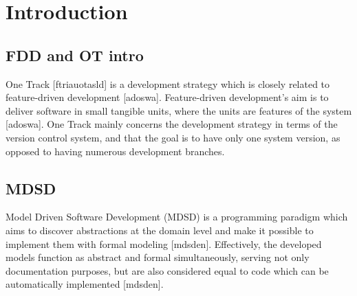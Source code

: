 \documentclass[fina_report_innit.tex]{subfiles}
\begin{document}
\section{Introduction}

\subsection{FDD and OT intro}
One Track [ftriauotasld] is a development strategy which is closely related to feature-driven development [adoswa]. Feature-driven development's aim is to deliver software in small tangible units, where the units are features of the system [adoswa]. One Track mainly concerns the development strategy in terms of the version control system, and that the goal is to have only one system version, as opposed to having numerous development branches. 

\subsection{MDSD}
Model Driven Software Development (MDSD) is a programming paradigm which aims to discover abstractions at the domain level and make it possible to implement them with formal modeling [mdsden]. Effectively, the developed models function as abstract and formal simultaneously, serving not only documentation purposes, but are also considered equal to code which can be automatically implemented [mdsden].
\end{document}
